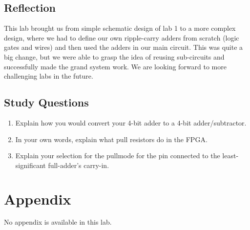 \documentclass[12pt]{article}
\begin{document}
\subsection*{Reflection}

This lab brought us from simple schematic design of lab 1 to a more complex design, where we had to define our own ripple-carry adders from scratch (logic gates and wires) and then used the adders in our main circuit. This was quite a big change, but we were able to grasp the idea of reusing sub-circuits and successfully made the grand system work. We are looking forward to more challenging labs in the future.

\subsection*{Study Questions}

\begin{enumerate}
    \item Explain how you would convert your 4-bit adder to a 4-bit adder/subtractor.

    \item In your own words, explain what pull resistors do in the FPGA.

    \item Explain your selection for the pullmode for the pin connected to the least-significant full-adder's carry-in.
\end{enumerate}

\section*{Appendix}

No appendix is available in this lab.
\end{document}

